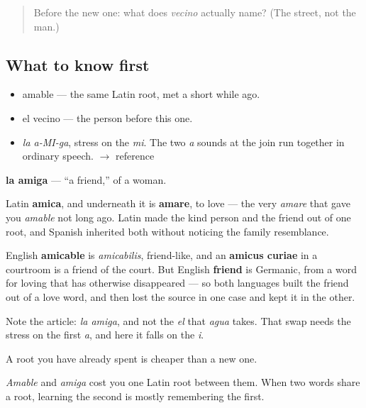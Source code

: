 \label{lesson:ES-C285-amiga}



\begin{quote}
Before the new one: what does \emph{vecino} actually name? (The street, not the man.)
\end{quote}

\subsection*{What to know first}
\begin{itemize}
\raggedright
  \item amable — the same Latin root, met a short while ago.
  \item el vecino — the person before this one.
\end{itemize}

\begin{sounds}
\begin{itemize}
\raggedright
  \item \emph{la a-MI-ga}, stress on the \emph{mi}. The two \emph{a} sounds at the join run together in ordinary speech. $\to$ reference
\end{itemize}
\end{sounds}

\begin{cousinweb}
\textbf{la amiga} — \textquotedblleft{}a friend,\textquotedblright{} of a woman.

Latin \textbf{amica}, and underneath it is \textbf{amare}, to love — the very \emph{amare} that gave you \emph{amable} not long ago. Latin made the kind person and the friend out of one root, and Spanish inherited both without noticing the family resemblance.

English \textbf{amicable} is \emph{amicabilis}, friend-like, and an \textbf{amicus curiae} in a courtroom is a friend of the court. But English \textbf{friend} is Germanic, from a word for loving that has otherwise disappeared — so both languages built the friend out of a love word, and then lost the source in one case and kept it in the other.

Note the article: \emph{la amiga}, and not the \emph{el} that \emph{agua} takes. That swap needs the stress on the first \emph{a}, and here it falls on the \emph{i}.
\end{cousinweb}

\begin{grammarlens}[title={What you've built}]
A root you have already spent is cheaper than a new one.

\emph{Amable} and \emph{amiga} cost you one Latin root between them. When two words share a root, learning the second is mostly remembering the first.
\end{grammarlens}

